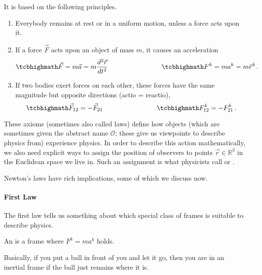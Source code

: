 It is based on the following principles.
\begin{post}
	\begin{enumerate}[1.]
		\item Everybody remains at rest or in a uniform motion, unless a force acts upon it.

		\item If a force $\vec{F}$ acts upon an object of mass $m$, it causes an acceleration
		\begin{equation}\label{eq:newton_second_law}
			\eqbox{
			\vec{F} = m \vec{a} = m \dv[2]{\vec{r}}{t}
			}
			\manyqquad
			\eqbox{
			F^k = m a^k = m \ddot{r}^k
			} \, .
		\end{equation}

		\item If two bodies exert forces on each other, these forces have the same magnitude but opposite directions (actio = reactio),
		\begin{equation}\label{eq:newton_third_law}
			\eqbox{
			\vec{F}_{12} = - \vec{F}_{21}
			}
			\manyqquad
			\eqbox{
			F_{12}^k = - F_{21}^k
			} \, .
		\end{equation}
	\end{enumerate}
\end{post}
These axioms (sometimes also called laws) define how objects (which are sometimes given the abstract name  $\mathcal{O}$; these give us viewpoints to describe physics from) experience physics. In order to describe this action mathematically, we also need explicit ways to assign the position of observers to points $\vec{r} \in \mathbb{R}^3$ in the Euclidean space we live in. Such an assignment is what physicists call  or .


Newton's laws have rich implications, some of which we discuss now.



			\paragraph{First Law}
The first law tells us something about which special class of frames is suitable to describe physics.
\begin{defi}
	An  is a frame where $F^k = m a^k$ holds.
\end{defi}
Basically, if you put a ball in front of you and let it go, then you are in an inertial frame if the ball just remains where it is.

